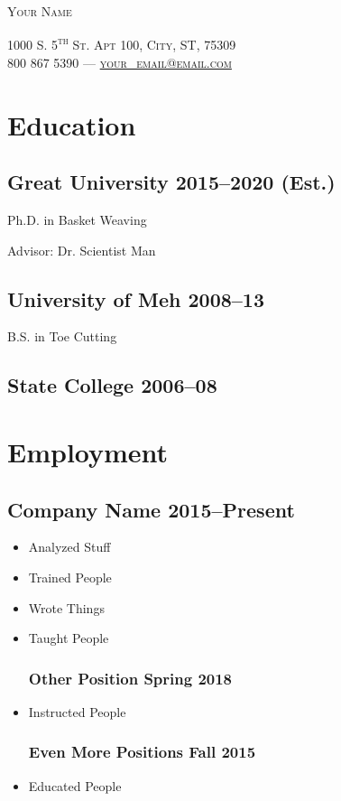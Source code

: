 \documentclass[11pt]{article}
\newcommand{\MyName}[1]{
		\Huge \begin{center} \textsf{\textsc{#1}} \end{center}
		\vspace{-20pt} \par \normalsize \normalfont
		}
\newcommand{\MyInformation}[1]{
		\large \begin{center} \textsf{\scshape{#1}} \end{center}
		\vspace{-15pt} \par \normalsize \normalfont
		}
\begin{document}
\thispagestyle{empty}
\MyName{Your Name}
\MyInformation{1000 S. 5\textsuperscript{th} St. Apt 100, City, ST, 75309 \\
               800 867 5390 --- \Large \href{mailto:your_email@email.com}
	          {your\_email@email.com}
}


\section*{Education}
\subsection*{Great University \hfill 2015--2020 (Est.)}
Ph.D. in Basket Weaving

Advisor: Dr. Scientist Man

\subsection*{University of Meh \hfill 2008--13}
B.S. in Toe Cutting

\subsection*{State College \hfill 2006--08}


\section*{Employment}
\subsection*{Company Name \hfill 2015--Present}

\begin{itemize}
\subsubsection*{Position Title \hfill 2016--Present}
\item Analyzed Stuff
\item Trained People
\item Wrote Things
\item Taught People

\subsubsection*{Other Position \hfill Spring 2018}
\item Instructed People

\subsubsection*{Even More Positions \hfill Fall 2015}
\item Educated People
\end{itemize}
\end{document}
